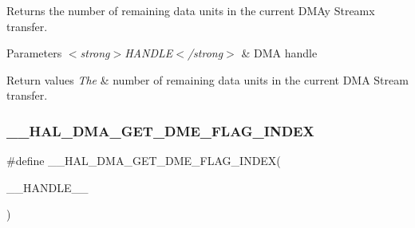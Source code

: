 Returns the number of remaining data units in the current D\+M\+Ay Streamx transfer. 


\begin{DoxyParams}{Parameters}
{\em $<$strong$>$\+H\+A\+N\+D\+L\+E$<$/strong$>$} & D\+MA handle\\
\hline
\end{DoxyParams}

\begin{DoxyRetVals}{Return values}
{\em The} & number of remaining data units in the current D\+MA Stream transfer. \\
\hline
\end{DoxyRetVals}
\mbox{\label{group___d_m_a_ga23d1f282af3b9aa7aa396dcad94865d8}} 
\subsubsection{\texorpdfstring{\_\_HAL\_DMA\_GET\_DME\_FLAG\_INDEX}{\_\_HAL\_DMA\_GET\_DME\_FLAG\_INDEX}}
{\footnotesize\ttfamily \#define \+\_\+\+\_\+\+H\+A\+L\+\_\+\+D\+M\+A\+\_\+\+G\+E\+T\+\_\+\+D\+M\+E\+\_\+\+F\+L\+A\+G\+\_\+\+I\+N\+D\+EX(\begin{DoxyParamCaption}\item[{}]{\+\_\+\+\_\+\+H\+A\+N\+D\+L\+E\+\_\+\+\_\+ }\end{DoxyParamCaption})}

